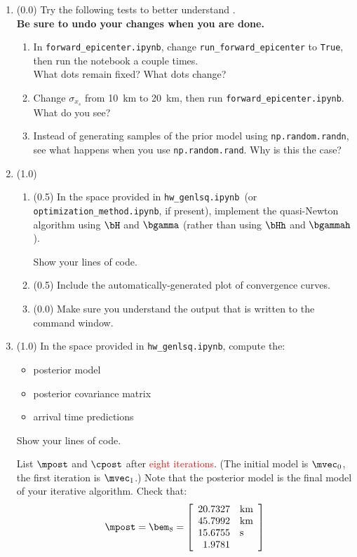 \documentclass[11pt,titlepage,fleqn]{article}
\newcommand{\tfile}{{\tt hw\_genlsq.ipynb}}
\newcommand{\tfileFE}{{\tt forward\_epicenter.ipynb}}
\newcommand{\tfileOM}{{\tt optimization\_method.ipynb}}
\begin{document}
\begin{enumerate}

\item (0.0) Try the following tests to better understand . \\
{\bf Be sure to undo your changes when you are done.}
%
\begin{enumerate}
\item In \tfileFE, change \verb+run_forward_epicenter+ to \verb+True+, then run the notebook a couple times. \\
What dots remain fixed? What dots change?

\item Change $\sigma_{x_s}$ from 10~km to 20~km, then run \tfileFE. What do you see?

\item Instead of generating samples of the prior model using \verb+np.random.randn+, see what happens when you use \verb+np.random.rand+. Why is this the case?
\end{enumerate}

\item (1.0)
%
\begin{enumerate}
\item (0.5) In the space provided in \tfile\ (or \tfileOM, if present), implement the quasi-Newton algorithm using $\bH$ and $\bgamma$ (rather than using $\bHh$ and $\bgammah$).

Show your lines of code.

\item (0.5) Include the automatically-generated plot of convergence curves.

\item (0.0) Make sure you understand the output that is written to the command window.
\end{enumerate}


\item (1.0) In the space provided in \tfile, compute the:
%
\begin{itemize}
\item posterior model
\item posterior covariance matrix
\item arrival time predictions
\end{itemize}

Show your lines of code.

List $\mpost$ and $\cpost$ after \textcolor{red}{eight iterations}. (The initial model is $\mvec_0$, the first iteration is $\mvec_1$.) Note that the posterior model is the final model of your iterative algorithm. Check that:
%
\begin{eqnarray}
\mpost = \bem_{8} =
\left[
\begin{array}{rl}
20.7327 & {\rm km} \\
45.7992 & {\rm km} \\
15.6755 & {\rm s} \\
1.9781  &  \\
\end{array}
\right]
\end{eqnarray}


\end{enumerate}
\end{document}
